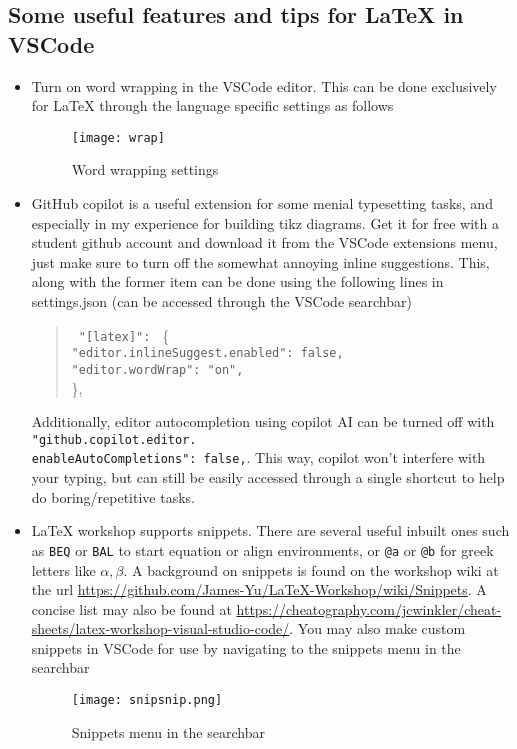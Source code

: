 \newpage
\subsection{Some useful features and tips for \LaTeX{} in VSCode}
\begin{itemize}
    \item Turn on word wrapping in the VSCode editor. This can be done exclusively for \LaTeX{} through the language specific settings as follows
    \begin{figure}[ht!]
        \centering
        \texttt{[image: wrap]}
        \caption{Word wrapping settings}
    \end{figure}
    \item GitHub copilot is a useful extension for some menial typesetting tasks, and especially in my experience for building tikz diagrams. Get it for free with a student github account and download it from the VSCode extensions menu, just make sure to turn off the somewhat annoying inline suggestions. This, along with the former item can be done using the following lines in settings.json (can be accessed through the VSCode searchbar)
    \begin{quote}
        \texttt{      
            "[latex]": } \{ \texttt{\\
                "editor.inlineSuggest.enabled": false,\\
                "editor.wordWrap": "on",\\
            }\},
    \end{quote}
    Additionally, editor autocompletion using copilot AI can be turned off with \texttt{"github.copilot.editor.\\enableAutoCompletions": false,}. This way, copilot won't interfere with your typing, but can still be easily accessed through a single shortcut to help do boring/repetitive tasks.

    \item LaTeX workshop supports snippets. There are several useful inbuilt ones such as \verb|BEQ| or \verb|BAL| to start equation or align environments, or \verb|@a| or \verb|@b| for greek letters like $\alpha,\beta$. A background on snippets is found on the workshop wiki at the url \url{https://github.com/James-Yu/LaTeX-Workshop/wiki/Snippets}. A concise list may also be found at \url{https://cheatography.com/jcwinkler/cheat-sheets/latex-workshop-visual-studio-code/}. You may also make custom snippets in VSCode for use by navigating to the snippets menu in the searchbar
    \begin{figure}[ht!]
        \centering
        \texttt{[image: snipsnip.png]}
        \caption{Snippets menu in the searchbar}
    \end{figure}
    

\end{itemize}
